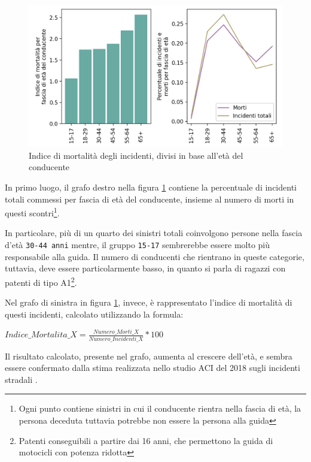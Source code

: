 \documentclass[a4paper,12pt]{report}
\newcommand{\columnstyle}[1]{\texttt{#1}}
\begin{document}
\begin{figure}
    \includegraphics[width=\linewidth]{../src/incidenti/incidenti_senza_coords/mortalita/indice_mortalita_eta.png}
    \caption{Indice di mortalità degli incidenti, divisi in base all'età del conducente}
    \label{fig:indice-mortalita-eta}
\end{figure}

In primo luogo, il grafo destro nella figura \ref{fig:indice-mortalita-eta} contiene 
la percentuale di incidenti totali commessi per fascia di età del conducente, insieme 
al numero di morti in questi scontri\footnote{Ogni punto contiene sinistri in 
cui il conducente rientra nella fascia di età, la persona deceduta tuttavia potrebbe non 
essere la persona alla guida}.

In particolare, più di un quarto dei sinistri totali coinvolgono persone nella 
fascia d'età \columnstyle{30-44 anni} mentre, il gruppo \columnstyle{15-17} sembrerebbe 
essere molto più responsabile alla guida. Il numero di conducenti che rientrano 
in queste categorie, tuttavia, deve essere particolarmente basso, in quanto si 
parla di ragazzi con patenti di tipo A1\footnote{Patenti conseguibili a partire dai 16 anni, 
che permettono la guida di motocicli con potenza ridotta}. 

Nel grafo di sinistra in figura \ref{fig:indice-mortalita-eta}, invece, 
è rappresentato l'indice di mortalità di questi incidenti, 
calcolato utilizzando la formula: 

\begin{center}
    $Indice\_Mortalita\_X = \displaystyle \frac{Numero\_Morti\_X}{Numero\_Incidenti\_X} * 100$ 
\end{center}

Il risultato calcolato, presente nel grafo, aumenta al crescere dell'età, 
e sembra essere confermato dalla stima realizzata nello studio 
ACI del 2018 sugli incidenti stradali \cite{ACI:3}. 
\end{document}
